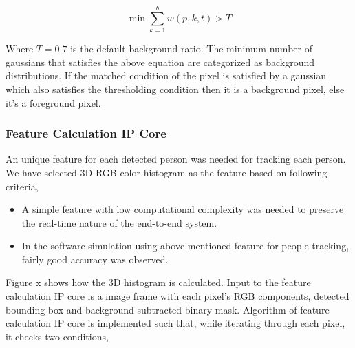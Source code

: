 \documentclass[12pt,a4paper]{report}
\begin{document}
\begin{equation}
\min \sum_{k=1}^{b} w(p,k,t)>T
\end{equation}

Where $T = 0.7$ is the default background ratio. The minimum number of gaussians that satisfies the above equation are categorized as background distributions. If the matched condition of the pixel is satisfied by a gaussian which also satisfies the thresholding condition then it is a background pixel, else it$’$s a foreground pixel.

\subsubsection{Feature Calculation IP Core}

An unique feature for each detected person was needed for tracking each person. We have selected 3D RGB color histogram as the feature based on following criteria,
\begin{itemize}
\item A simple feature with low computational complexity was needed to preserve the real-time nature of the end-to-end system.
\item In the software simulation using above mentioned feature for people tracking, fairly good accuracy was observed. 
\end{itemize}

Figure x shows how the 3D histogram is calculated. Input to the feature calculation IP core is a image frame with each pixel’s RGB components, detected bounding box and background subtracted binary mask.
Algorithm of feature calculation IP core is implemented such that, while iterating through each pixel, it checks two conditions,
\end{document}
